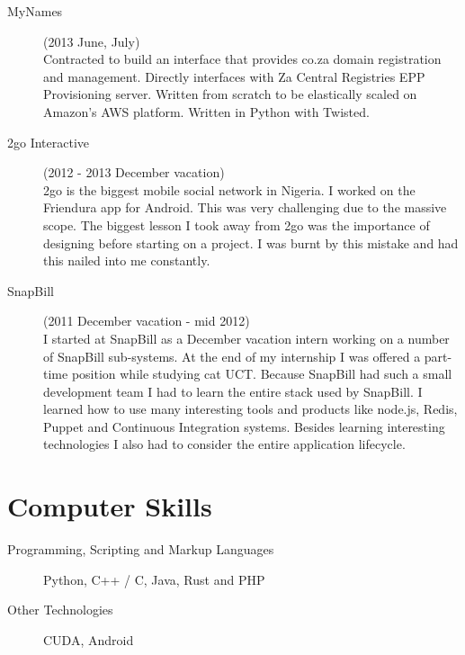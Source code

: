\documentclass[margin,line,a4paper]{resume}
\begin{document}
\begin{resume}
\begin{description}
                \item[MyNames] (2013 June, July) \\
                    Contracted to build an interface that provides co.za domain registration and management. 
                    Directly interfaces with Za Central Registries EPP Provisioning server. Written from scratch
                    to be elastically scaled on Amazon's AWS platform. Written in Python with Twisted.

                \item[2go Interactive] (2012 - 2013 December vacation) \\
                    2go is the biggest mobile social network in Nigeria. I worked on the Friendura app for Android. 
                    This was very challenging due to the massive scope. The biggest lesson I took away from 
                    2go was the importance of designing before starting on a project. I was burnt by this 
                    mistake and had this nailed into me constantly.

                \item[SnapBill] (2011 December vacation - mid 2012) \\
                    I started at SnapBill as a December vacation intern working on a number of SnapBill 
                    sub-systems. At the end of my internship I was offered a part-time position while studying 
                    cat UCT. Because SnapBill had such a small development team I had to learn the entire stack 
                    used by SnapBill. I learned how to use many interesting tools and products like node.js, 
                    Redis, Puppet and Continuous Integration systems. Besides learning interesting technologies 
                    I also had to consider the entire application lifecycle. 
            \end{description}

        \section{\mysidestyle Computer Skills}
            \begin{description}
                \item [Programming, Scripting and Markup Languages] Python, C++ / C, Java, Rust and PHP
                \item [Other Technologies] CUDA, Android
            \end{description}


\end{resume}
\end{document}
